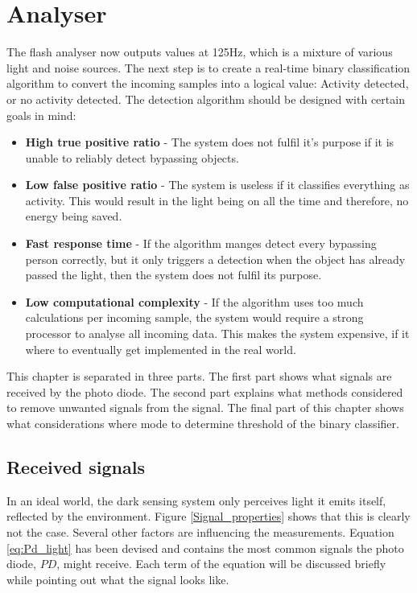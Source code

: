 \chapter{Analyser}
\label{chp:Analyser}
The flash analyser now outputs values at 125Hz, which is a mixture of various light and noise sources. The next step is to create a real-time binary classification algorithm to convert the incoming samples into a logical value: Activity detected, or no activity detected. The detection algorithm should be designed with certain goals in mind:
\begin{itemize}[itemsep=-1ex]
	\item \textbf{High true positive ratio} - The system does not fulfil it's purpose if it is unable to reliably detect bypassing objects.
	\item \textbf{Low false positive ratio} - The system is useless if it classifies everything as activity. This would result in the light being on all the time and therefore, no energy being saved.
	\item \textbf{Fast response time} - If the algorithm manges detect every bypassing person correctly, but it only triggers a detection when the object has already passed the light, then the system does not fulfil its purpose.
	\item \textbf{Low computational complexity} - If the algorithm uses too much calculations per incoming sample, the system would require a strong processor to analyse all incoming data. This makes the system expensive, if it where to eventually get implemented in the real world.
\end{itemize}
This chapter is separated in three parts. The first part shows what signals are received by the photo diode. The second part explains what methods considered to remove unwanted signals from the signal. The final part of this chapter shows what considerations where mode to determine threshold of the binary classifier.

\section{Received signals}
In an ideal world, the dark sensing system only perceives light it emits itself, reflected by the environment. Figure \ref{Signal_properties} shows that this is clearly not the case. Several other factors are influencing the measurements. Equation \ref{eq:Pd_light} has been devised and contains the most common signals the photo diode, $PD$, might receive. Each term of the equation will be discussed briefly while pointing out what the signal looks like.

